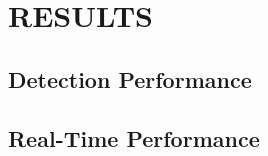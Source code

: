 \documentclass[]{spie}  %
\begin{document}

\section{RESULTS}
\label{sec:results}

\subsection{Detection Performance}

\subsection{Real-Time Performance}
\end{document}
